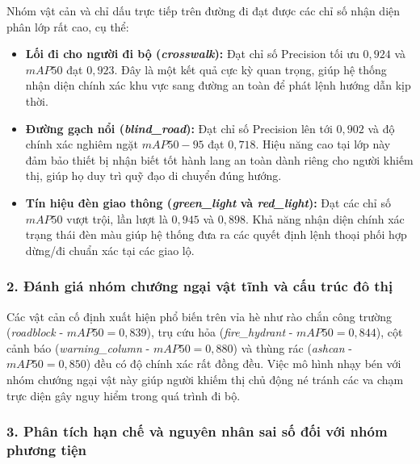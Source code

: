 Nhóm vật cản và chỉ dấu trực tiếp trên đường đi đạt được các chỉ số nhận diện phân lớp rất cao, cụ thể:
\begin{itemize}
    \item \textbf{Lối đi cho người đi bộ (\textit{crosswalk}):} Đạt chỉ số Precision tối ưu $0,924$ và $mAP50$ đạt $0,923$. Đây là một kết quả cực kỳ quan trọng, giúp hệ thống nhận diện chính xác khu vực sang đường an toàn để phát lệnh hướng dẫn kịp thời.
    \item \textbf{Đường gạch nổi (\textit{blind\_road}):} Đạt chỉ số Precision lên tới $0,902$ và độ chính xác nghiêm ngặt $mAP50-95$ đạt $0,718$. Hiệu năng cao tại lớp này đảm bảo thiết bị nhận biết tốt hành lang an toàn dành riêng cho người khiếm thị, giúp họ duy trì quỹ đạo di chuyển đúng hướng.
    \item \textbf{Tín hiệu đèn giao thông (\textit{green\_light} và \textit{red\_light}):} Đạt các chỉ số $mAP50$ vượt trội, lần lượt là $0,945$ và $0,898$. Khả năng nhận diện chính xác trạng thái đèn màu giúp hệ thống đưa ra các quyết định lệnh thoại phối hợp dừng/đi chuẩn xác tại các giao lộ.
\end{itemize}

\subsubsection*{2. Đánh giá nhóm chướng ngại vật tĩnh và cấu trúc đô thị}

Các vật cản cố định xuất hiện phổ biến trên vỉa hè như rào chắn công trường (\textit{roadblock} - $mAP50 = 0,839$), trụ cứu hỏa (\textit{fire\_hydrant} - $mAP50 = 0,844$), cột cảnh báo (\textit{warning\_column} - $mAP50 = 0,880$) và thùng rác (\textit{ashcan} - $mAP50 = 0,850$) đều có độ chính xác rất đồng đều. Việc mô hình nhạy bén với nhóm chướng ngại vật này giúp người khiếm thị chủ động né tránh các va chạm trực diện gây nguy hiểm trong quá trình đi bộ.

\subsubsection*{3. Phân tích hạn chế và nguyên nhân sai số đối với nhóm phương tiện}

